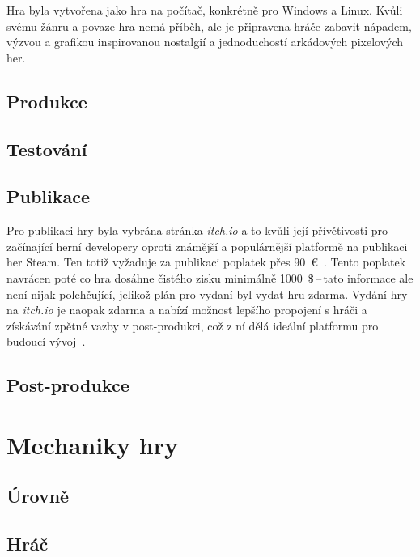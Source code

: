 Hra byla vytvořena jako hra na počítač, konkrétně pro Windows a Linux. Kvůli svému žánru a povaze hra nemá příběh, ale je připravena hráče zabavit nápadem, výzvou a grafikou inspirovanou nostalgií a jednoduchostí arkádových pixelových her.


\subsection*{Produkce}


\subsection*{Testování}


\subsection*{Publikace}
Pro publikaci hry byla vybrána stránka \textit{itch.io} a to kvůli její přívětivosti pro začínající herní developery oproti známější a populárnější platformě na publikaci her Steam. Ten totiž vyžaduje za publikaci poplatek přes 90~€~\cite{Steam_submission}. Tento poplatek navrácen poté co hra dosáhne čistého zisku minimálně 1000~\$\,--\,tato informace ale není nijak polehčující, jelikož plán pro vydaní byl vydat hru zdarma. Vydání hry na \textit{itch.io} je naopak zdarma a nabízí možnost lepšího propojení s hráči a získávání zpětné vazby v post-produkci, což z ní dělá ideální platformu pro budoucí vývoj~\cite{GDevelop}.

\subsection*{Post-produkce}


\section{Mechaniky hry}\label{chap:Mechaniky hry}
\subsection*{Úrovně}
\subsection*{Hráč}
